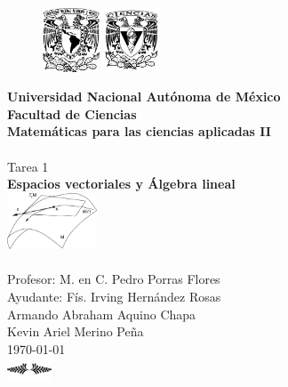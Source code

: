 \documentclass[letterpaper]{article}
\renewcommand{\*}{\cdot}
\theoremstyle{definition}
\begin{document}
		\begin{titlepage}
		\begin{center}
			\begin{figure}[h]
				\includegraphics*[width=0.15\textwidth]{unam}
				\centering
				\hspace{0.6cm}
				\includegraphics*[width=0.15\textwidth]{ciencias}
				\centering
			\end{figure}
			\Large{\textbf{Universidad Nacional Autónoma de México}} \\[0.5cm]
			\Large{\textbf{Facultad de Ciencias}} \\[0.5cm]
			\Large{\textbf{Matemáticas para las ciencias aplicadas II}} \\[0.5cm]
			\hrulefill \\[2cm]
			\Huge{Tarea 1}\\
			\Huge{\textbf{Espacios vectoriales y Álgebra lineal}}\\ [1cm]
			\includegraphics*[width=0.2\textwidth]{space}\\[1.5cm]
			\hrulefill \\[1.5cm]
			\large{Profesor: M. en C. Pedro Porras Flores}\\
			\large{Ayudante: Fís. Irving Hernández Rosas}\\
			\large{Armando Abraham Aquino Chapa}\\
			\large{Kevin Ariel Merino Peña}
			\\[1cm]
			\today\\ [0.3cm]
			\includegraphics[width=0.1\textwidth]{ornamental}
		\end{center}
	\end{titlepage}
\end{document}
